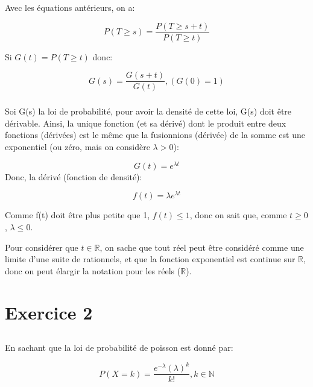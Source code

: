 \documentclass[a4paper]{article}
\begin{document}
Avec les équations antérieurs, on a: 

\begin{equation}
P(T\geq s )=\frac{P(T\geq s+t )}{P(T\geq t )}
\end{equation}

Si $G(t)=P(T\geq t )$ donc: 

\begin{equation}
G(s)=\frac{G(s+t)}{G(t)}, (G(0)= 1)
\end{equation}

\subsubsection{}
Soi G(s) la  loi de probabilité, pour  avoir la densité de cette  loi, G(s) doit
être dérivable. Ainsi, la unique fonction (et sa dérivé) dont le produit entre deux
fonctions (dérivées) est le même que la fusionnions (dérivée) de la somme est une
exponentiel (ou zéro, mais on considère $\lambda >0$):

\begin{equation}
G(t)=e^{\lambda t}
\end{equation}
Donc, la dérivé (fonction de densité):

\begin{equation}
f(t)=\lambda e^{\lambda t}
\end{equation}

Comme f(t)  doit être plus petite  que 1, $f(t)\leq  1$, donc on sait  que, comme
$t\geq 0$, $\lambda \leq 0$.

Pour  considérer que  $t  \in \mathbb{R}$,  on  sache que  tout  réel peut  être
considéré  comme  une limite  d'une  suite de  rationnels,  et  que la  fonction
exponentiel est continue sur $\mathbb{R}$,  donc on peut élargir la notation pour
les réels ($\mathbb{R}$).

\section{Exercice 2 }


\subsection{}
En sachant que la loi de probabilité de poisson est donné par:

\begin{equation}
P(X=k )=\frac{e^{-\lambda }(\lambda )^k}{k!},k \in \mathbb{N}
\end{equation}
\end{document}
